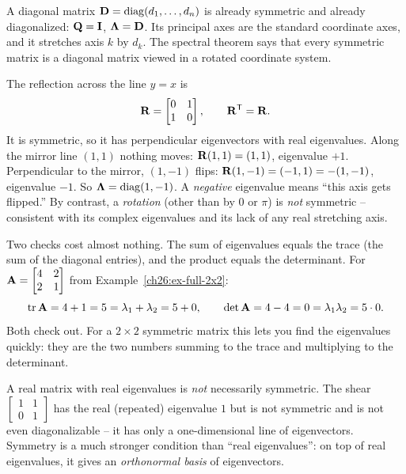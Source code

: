 \begin{example}
\label{ch26:ex-diagonal}
A diagonal matrix $\mathbf{D}=\operatorname{diag}(d_1,\dots,d_n)$ is already symmetric and already
diagonalized: $\mathbf{Q}=\mathbf{I}$, $\mathbf{\Lambda}=\mathbf{D}$. Its principal axes are
the standard coordinate axes, and it stretches axis $k$ by $d_k$. The spectral
theorem says that every symmetric matrix is a diagonal matrix viewed in a rotated
coordinate system.
\end{example}

\begin{example}
\label{ch26:ex-reflection}
The reflection across the line $y=x$ is
\[
  \mathbf{R} = \begin{bmatrix} 0 & 1 \\ 1 & 0 \end{bmatrix},\qquad \mathbf{R}^{\mathsf{T}}=\mathbf{R}.
\]
It is symmetric, so it has perpendicular eigenvectors with real eigenvalues. Along
the mirror line $(1,1)$ nothing moves: $\mathbf{R}(1,1)=(1,1)$, eigenvalue $+1$.
Perpendicular to the mirror, $(1,-1)$ flips: $\mathbf{R}(1,-1)=(-1,1)=-(1,-1)$,
eigenvalue $-1$. So $\mathbf{\Lambda}=\operatorname{diag}(1,-1)$. A \emph{negative} eigenvalue
means ``this axis gets flipped.'' By contrast, a \emph{rotation} (other than by
$0$ or $\pi$) is \emph{not} symmetric -- consistent with its complex eigenvalues
and its lack of any real stretching axis.
\end{example}

\begin{example}
\label{ch26:ex-trace-det}
Two checks cost almost nothing. The sum of eigenvalues equals the trace (the
sum of the diagonal entries), and the product equals the determinant. For
$\mathbf{A}=\begin{bmatrix}4&2\\2&1\end{bmatrix}$ from
Example~\ref{ch26:ex-full-2x2}:
\[
  \operatorname{tr}\mathbf{A}=4+1=5=\lambda_1+\lambda_2=5+0,
  \qquad
  \det\mathbf{A}=4-4=0=\lambda_1\lambda_2=5\cdot 0.
\]
Both check out. For a
$2\times 2$ symmetric matrix this lets you find the eigenvalues quickly:
they are the two numbers summing to the trace and multiplying to the
determinant.
\end{example}

\begin{trapbox}
A real matrix with real eigenvalues is \emph{not} necessarily symmetric. The shear
$\begin{bmatrix}1&1\\0&1\end{bmatrix}$ has the real (repeated) eigenvalue $1$ but
is not symmetric and is not even diagonalizable -- it has only a one-dimensional
line of eigenvectors. Symmetry is a much stronger condition than ``real
eigenvalues'': on top of real eigenvalues, it gives an
\emph{orthonormal basis} of eigenvectors.
\end{trapbox}

